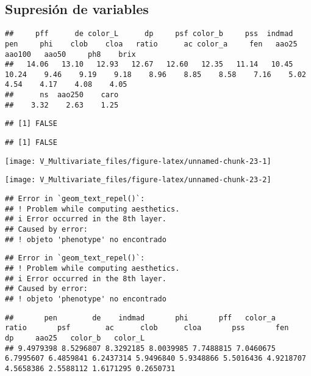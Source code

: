 \documentclass[
]{article}
\begin{document}
\subsection{Supresión de variables}\label{supresiuxf3n-de-variables}

\begin{verbatim}
##     pff      de color_L      dp     psf color_b     pss  indmad     pen     phi    clob    cloa   ratio      ac color_a     fen   aao25  aao100   aao50     ph8    brix 
##   14.06   13.10   12.93   12.67   12.60   12.35   11.14   10.45   10.24    9.46    9.19    9.18    8.96    8.85    8.58    7.16    5.02    4.54    4.17    4.08    4.05 
##      ns  aao250    caro 
##    3.32    2.63    1.25
\end{verbatim}

\begin{verbatim}
## [1] FALSE
\end{verbatim}

\begin{verbatim}
## [1] FALSE
\end{verbatim}

\begin{center}\texttt{[image: V\_Multivariate\_files/figure-latex/unnamed-chunk-23-1]} \end{center}

\begin{center}\texttt{[image: V\_Multivariate\_files/figure-latex/unnamed-chunk-23-2]} \end{center}

\begin{verbatim}
## Error in `geom_text_repel()`:
## ! Problem while computing aesthetics.
## i Error occurred in the 8th layer.
## Caused by error:
## ! objeto 'phenotype' no encontrado
\end{verbatim}

\begin{verbatim}
## Error in `geom_text_repel()`:
## ! Problem while computing aesthetics.
## i Error occurred in the 8th layer.
## Caused by error:
## ! objeto 'phenotype' no encontrado
\end{verbatim}

\begin{verbatim}
##       pen        de    indmad       phi       pff   color_a     ratio       psf        ac      clob      cloa       pss       fen        dp     aao25   color_b   color_L 
## 9.4979398 8.5296807 8.3292185 8.0039985 7.7488815 7.0460675 6.7995607 6.4859841 6.2437314 5.9496840 5.9348866 5.5016436 4.9218707 4.5658386 2.5588112 1.6171295 0.2650731
\end{verbatim}
\end{document}
